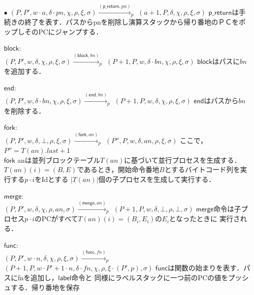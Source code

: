 \documentclass[submit,PRO]{ipsj}
\newcommand{\bcode}[1]{$\mathsf{#1}$}
\begin{document}
\begin{list}{$\bullet$}{}
$(P,P',w\cdot a,\delta\cdot pn,\chi,\rho,\xi,\sigma)\xrightarrow{(\mathsf{p\_return},pn)}_p$\newline
\qquad $(a+1,P,\delta,\chi,\rho,\xi,\sigma)$\newline
\bcode{p\_return}は手続きの終了を表す．パスからpnを削除し演算スタックから帰り番地のＰＣをポップしそのPCにジャンプする．
\item \bcode{block}:\\
$(P,P',w,\delta,\chi,\rho,\xi,\sigma)\xrightarrow{(\mathsf{block},bn)}_p$\newline
\qquad $(P+1,P,w,\delta\cdot bn,\chi,\rho,\xi,\sigma)$\newline
\bcode{block}はパスに$bn$を追加する．
\item \bcode{end}:\\
$(P,P',w,\delta\cdot bn,\chi,\rho,\xi,\sigma)\xrightarrow{(\mathsf{end},bn)}_p$\newline
\qquad $(P+1,P,w,\delta,\chi,\rho,\xi,\sigma)$\newline
\bcode{end}はパスから$bn$を削除する．
\item \bcode{fork}:\\
$(P,P',w,\delta,\bot,\rho,\xi,\sigma)\xrightarrow{(\mathsf{fork},an)}_p$\newline
\qquad $(P'',P,w,\delta,an,\rho,\xi,\sigma)$\newline
ここで，$P''=T(an).last+1$\\
\bcode{fork} anは並列ブロックテーブル$T(an)$に基づいて並行プロセスを生成する．
$T(an)(i)=(B,E)$であるとき，開始命令番地$B$とするバイトコード列を実行する$p\cdot i$をIdとする
$|T(an)|$個の子プロセスを生成して実行する．
\item \bcode{merge}:\\
$(P,P',w,\delta,\chi,\rho,an,\sigma)\xrightarrow{(\mathsf{merge},an)}_p$\newline
\qquad $(P+1,P,w,\delta,\bot,\rho,\bot,\sigma)$\newline
\bcode{merge}命令は子プロセス$p\cdot i$のPCがすべて$T(an)(i)=(B_i,E_i)$の$E_i$となったときに
実行される．
\item \bcode{func}:\\
$(P,P',w\cdot n,\delta,\chi,\rho,\xi,\sigma)\xrightarrow{(\mathsf{func},fn)}_p$\newline
\qquad $(P+1,P,w\cdot P'+1\cdot n,\delta\cdot fn,\chi,\rho,\xi\cdot(P',p),\sigma)$\newline
\bcode{func}は関数の始まりを表す．パスにfnを追加し，\bcode{label}命令と
      同様にラベルスタックに一つ前のPCの値をプッシュする．帰り番地を保存

\end{list}
\end{document}
